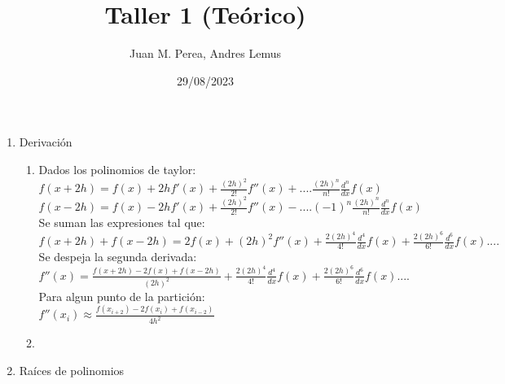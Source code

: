 \documentclass{article}
\title{Taller 1 (Teórico)}
\author{Juan M. Perea, Andres Lemus}
\date{29/08/2023}
\begin{document}
\maketitle

\begin{enumerate}
\renewcommand{\theenumi}{\roman{enumi}}
\item Derivación
	\begin{enumerate}
	\renewcommand{\theenumii}{\arabic{enumii}}
	\item
		Dados los polinomios de taylor:\\
		$f(x+2h)=f(x)+2hf'(x)+\frac{(2h)^2}{2!}f''(x)+....\frac{(2h)^n}{n!}\frac{d^n}{dx}f(x)$\\
		$f(x-2h)=f(x)-2hf'(x)+\frac{(2h)^2}{2!}f''(x)-....(-1)^n\frac{(2h)^n}{n!}\frac{d^n}{dx}f(x)$\\
		Se suman las expresiones tal que:\\
		$f(x+2h)+f(x-2h)=2f(x)+(2h)^2f''(x)+\frac{2(2h)^4}{4!}\frac{d^4}{dx}f(x)+\frac{2(2h)^6}{6!}\frac{d^6}{dx}f(x)....$\\
		Se despeja la segunda derivada:\\
		$f''(x)=\frac{f(x+2h)-2f(x)+f(x-2h)}{(2h)^2}+\frac{2(2h)^4}{4!}\frac{d^4}{dx}f(x)+\frac{2(2h)^6}{6!}\frac{d^6}{dx}f(x)....$\\
		Para algun punto de la partición:\\
		$f''(x_i)\approx\frac{f(x_{i+2})-2f(x_i)+f(x_{i-2})}{4h^2}$
	\item
	\end{enumerate}
\item Raíces de polinomios
\end{enumerate}
\end{document}
